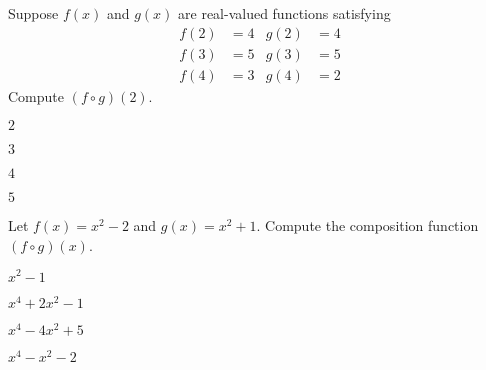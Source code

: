 \begin{readinessAssuranceTest}
\setcounter{enumi}{40}
\item Suppose $f(x)$ and $g(x)$ are real-valued functions satisfying
\begin{align*}
f(2) &= 4 & g(2) & = 4 \\
f(3) &= 5 & g(3) &= 5 \\
f(4) &= 3 & g(4) &= 2
\end{align*}
Compute $(f \circ g)(2)$.
\begin{multicols}{4}
\begin{readinessAssuranceTestChoices}
\item $2$
\item $3$ %
\item $4$
\item $5$
\end{readinessAssuranceTestChoices}
\end{multicols}

\item Let $f(x) = x^2-2$ and $g(x)= x^2+1$.  Compute the composition function $(f \circ g)(x)$.
\begin{multicols}{4}
\begin{readinessAssuranceTestChoices}
\item $x^2-1$
\item $x^4+2x^2-1$ %
\item $x^4-4x^2+5$
\item $x^4-x^2-2$
\end{readinessAssuranceTestChoices}
\end{multicols}




\end{readinessAssuranceTest}
